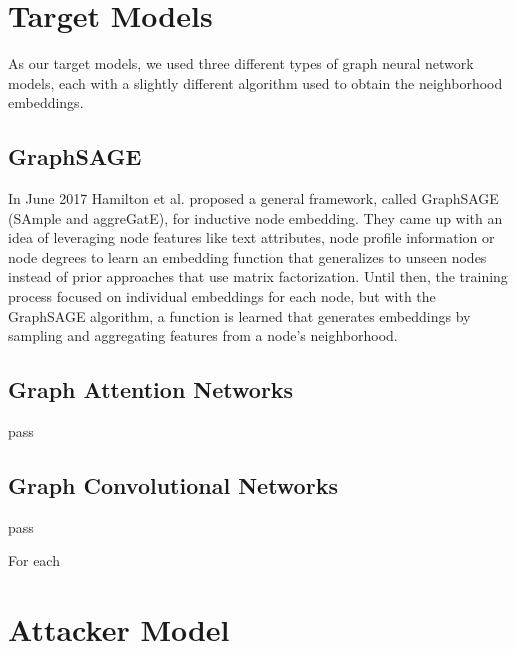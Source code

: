   \section{Target Models}

    As our target models, we used three different types of graph neural network models, each with a slightly different algorithm used to obtain the neighborhood embeddings.

    \subsection*{GraphSAGE}
      In June 2017 Hamilton et al.\cite{hamilton2018inductive} proposed a general framework, called GraphSAGE (SAmple and aggreGatE), for inductive node embedding. 
      They came up with an idea of leveraging node features like text attributes, node profile information or node degrees to learn an embedding function that generalizes to unseen nodes instead of prior approaches that use matrix factorization.
      Until then, the training process focused on individual embeddings for each node, but with the GraphSAGE algorithm, a function is learned that generates embeddings by sampling and aggregating features from a node's neighborhood.

    \subsection*{Graph Attention Networks}
      pass

    \subsection*{Graph Convolutional Networks}
      pass

    For each   


  \section{Attacker Model}
